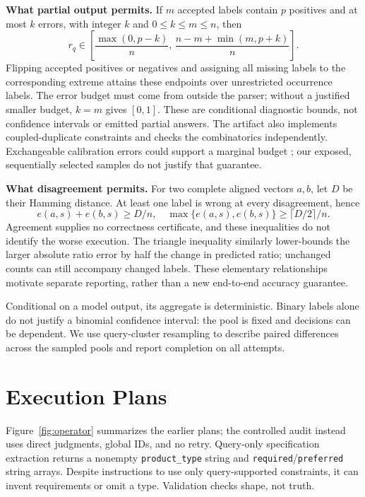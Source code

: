 \documentclass[conference]{IEEEtran}
\begin{document}
\textbf{What partial output permits.} If $m$ accepted labels contain $p$ positives and at most $k$ errors, with integer $k$ and $0\leq k\leq m\leq n$, then
\begin{equation}
r_q\in\left[\frac{\max(0,p-k)}{n},\,
\frac{n-m+\min(m,p+k)}{n}\right].
\label{eq:bounds}
\end{equation}
Flipping accepted positives or negatives and assigning all missing labels to the corresponding extreme attains these endpoints over unrestricted occurrence labels. The error budget must come from outside the parser; without a justified smaller budget, $k=m$ gives $[0,1]$. These are conditional diagnostic bounds, not confidence intervals or emitted partial answers. The artifact also implements coupled-duplicate constraints and checks the combinatorics independently. Exchangeable calibration errors could support a marginal budget \cite{conformal}; our exposed, sequentially selected samples do not justify that guarantee.

\textbf{What disagreement permits.} For two complete aligned vectors $a,b$, let $D$ be their Hamming distance. At least one label is wrong at every disagreement, hence
\begin{equation}
e(a,s)+e(b,s)\geq D/n,\quad
\max\{e(a,s),e(b,s)\}\geq\lceil D/2\rceil/n.
\label{eq:stability}
\end{equation}
Agreement supplies no correctness certificate, and these inequalities do not identify the worse execution. The triangle inequality similarly lower-bounds the larger absolute ratio error by half the change in predicted ratio; unchanged counts can still accompany changed labels. These elementary relationships motivate separate reporting, rather than a new end-to-end accuracy guarantee.

Conditional on a model output, its aggregate is deterministic. Binary labels alone do not justify a binomial confidence interval: the pool is fixed and decisions can be dependent. We use query-cluster resampling to describe paired differences across the sampled pools and report completion on all attempts.

\section{Execution Plans}
Figure~\ref{fig:operator} summarizes the earlier plans; the controlled audit instead uses direct judgments, global IDs, and no retry. Query-only specification extraction returns a nonempty \texttt{product\_type} string and \texttt{required}/\texttt{preferred} string arrays. Despite instructions to use only query-supported constraints, it can invent requirements or omit a type. Validation checks shape, not truth.
\end{document}
